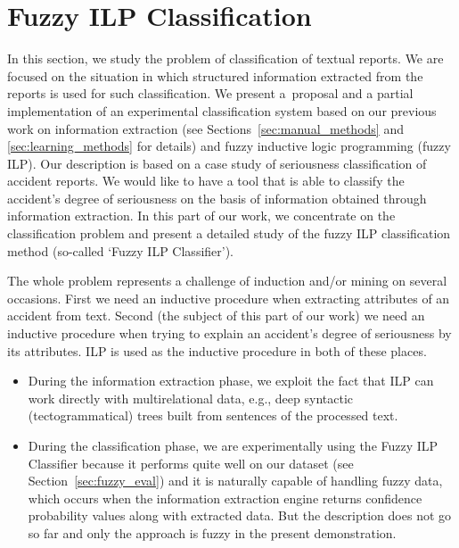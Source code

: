 \section{Fuzzy ILP Classification} \label{sec:fuzzy_methods}
\graphicspath{{../img/ch80/}}

In this section, we study the problem of classification of textual reports. We are %
 focused on the situation in which structured information extracted from the reports is used for such classification. We present a~proposal and a partial implementation of an experimental classification system based on our previous work on information extraction (see Sections~\ref{sec:manual_methods} and \ref{sec:learning_methods} for details) and fuzzy inductive logic programming (fuzzy ILP).
Our description is based on a case study of seriousness classification of accident reports. 
We would like to have a tool that is able to classify the accident's degree of seriousness on the basis of information obtained through information extraction.
In this part of our work,
we concentrate on the classification problem and present a detailed study of the fuzzy ILP classification method (so-called `Fuzzy ILP Classifier'). 

The whole problem represents a challenge of induction and/or mining on several occasions. First we need an inductive procedure when extracting attributes of an accident from text. Second (the subject of this part of our work) we need an inductive procedure when trying to explain an accident's degree of seriousness by its attributes. ILP is used as the inductive procedure in both of these places.
\begin{itemize}
	\item During the information extraction phase, we exploit the fact that ILP can work directly with multirelational data, e.g., deep syntactic (tectogrammatical) trees built from sentences of the processed text.
	\item During the classification phase, we are experimentally using the Fuzzy ILP Classifier because it performs quite well on our dataset (see Section~\ref{sec:fuzzy_eval}) and it is naturally capable of handling fuzzy data, which occurs when the information extraction engine returns confidence probability values along with extracted data. But the description does not go so far and only the approach is fuzzy in the present demonstration.
\end{itemize}





